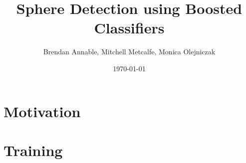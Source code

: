 \documentclass{beamer}
\title{Sphere Detection using Boosted Classifiers}
\author{Brendan Annable, Mitchell Metcalfe, Monica Olejniczak}
\institute{The University of Newcastle, Australia}
\date{\today}
\begin{document}
	\maketitle

	\section{Motivation}
	
			









\section{Training}
\end{document}
